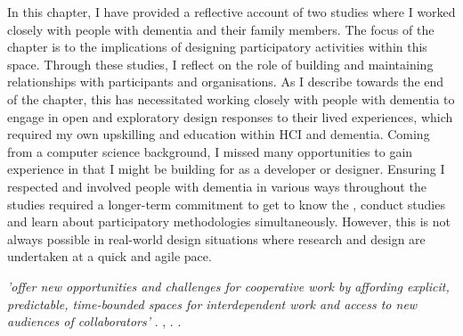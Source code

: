 \newpage
In this chapter, I have provided a reflective account of two studies where I worked closely with people with dementia and their family members. The focus of the chapter is to  the implications of designing participatory activities within this space. Through these studies, I reflect on the role of building and maintaining relationships with participants and organisations. As I describe towards the end of the chapter, this has necessitated working closely with people with dementia to engage in open and exploratory design responses to their lived experiences, which required my own upskilling and education within HCI and dementia. Coming from a computer science background, I missed many opportunities to gain experience in  that I might be building for as a developer or designer. Ensuring I respected and involved people with dementia in various ways throughout the studies required a longer-term commitment to get to know the , conduct  studies and learn about participatory methodologies simultaneously. However, this is not always possible in real-world design situations where research and design are undertaken at a quick and agile pace. 

 \textit{’offer new opportunities and challenges for cooperative work by affording explicit, predictable, time-bounded spaces for interdependent work and access to new audiences of collaborators’} \citep{filippova_hacking_2017}.  \citep{jones_theres_2015},  \citep{nandi_hackathons_2016}.  \citep{jones_theres_2015}. 
 
